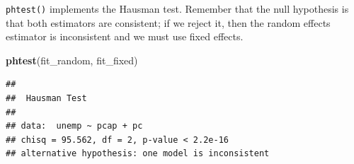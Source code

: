 \documentclass[12pt,oneside,openany]{book}
\newenvironment{Shaded}{\begin{snugshade}}{\end{snugshade}}
\newcommand{\KeywordTok}[1]{\textcolor[rgb]{0.13,0.29,0.53}{\textbf{#1}}}
\newcommand{\NormalTok}[1]{#1}
\begin{document}
\texttt{phtest()} implements the Hausman test. Remember that the null
hypothesis is that both estimators are consistent; if we reject it, then
the random effects estimator is inconsistent and we must use fixed
effects.

\begin{Shaded}
\begin{Highlighting}[]
\KeywordTok{phtest}\NormalTok{(fit_random, fit_fixed)}
\end{Highlighting}
\end{Shaded}

\begin{verbatim}
## 
##  Hausman Test
## 
## data:  unemp ~ pcap + pc
## chisq = 95.562, df = 2, p-value < 2.2e-16
## alternative hypothesis: one model is inconsistent
\end{verbatim}


\end{document}
